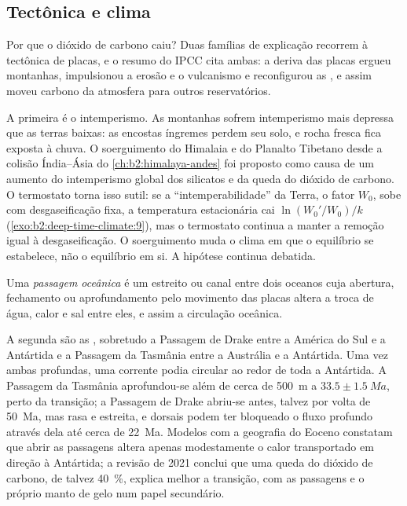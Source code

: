\subsection*{Tectônica e clima}

Por que o dióxido de carbono caiu? Duas famílias de explicação recorrem à tectônica de placas, e o resumo do
IPCC cita ambas: a deriva das placas ergueu montanhas, impulsionou a erosão e o vulcanismo e
reconfigurou as , e assim moveu carbono da atmosfera para outros reservatórios.

A primeira é o intemperismo. As montanhas sofrem intemperismo mais depressa que as terras baixas: as encostas íngremes perdem seu
solo, e rocha fresca fica exposta à chuva. O soerguimento do Himalaia e do Planalto Tibetano desde
a colisão Índia--Ásia do \cref{ch:b2:himalaya-andes} foi proposto como causa de um aumento do
intemperismo global dos silicatos e da queda do dióxido de carbono. O termostato torna isso sutil: se a
``intemperabilidade'' da Terra, o fator $W_0$, sobe com desgaseificação fixa, a temperatura estacionária
cai $\ln(W_0'/W_0)/k$ (\cref{exo:b2:deep-time-climate:9}), mas o termostato continua a manter a
remoção igual à desgaseificação. O soerguimento muda o clima em que o equilíbrio se estabelece, não o
equilíbrio em si. A hipótese continua debatida.

\begin{definition}\label{def:b2:deep-time-climate:gateway}
Uma \emph{passagem oceânica} é um estreito ou canal entre dois oceanos cuja abertura,
fechamento ou aprofundamento pelo movimento das placas altera a troca de água, calor e sal entre eles, e
assim a circulação oceânica.
\end{definition}

A segunda são as , sobretudo a Passagem de Drake entre a América do Sul e a Antártida
e a Passagem da Tasmânia entre a Austrália e a Antártida. Uma vez ambas profundas, uma corrente podia circular
ao redor de toda a Antártida. A Passagem da Tasmânia aprofundou-se além de cerca de \qty{500}{m} a $33.5 \pm
\qty{1.5}{Ma}$, perto da transição; a Passagem de Drake abriu-se antes, talvez por volta de \qty{50}{Ma},
mas rasa e estreita, e dorsais podem ter bloqueado o fluxo profundo através dela até cerca de \qty{22}{Ma}. Modelos com
a geografia do Eoceno constatam que abrir as passagens altera apenas modestamente o calor transportado em direção à
Antártida; a revisão de 2021 conclui que uma queda do dióxido de carbono, de talvez
\qty{40}{\percent}, explica melhor a transição, com as passagens e o próprio manto de gelo num
papel secundário.


